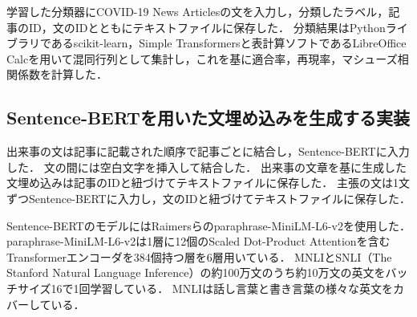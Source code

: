 \documentclass[12pt,a4j,dvipdfmx]{jreport}
\begin{document}

学習した分類器にCOVID-19 News Articlesの文を入力し，分類したラベル，記事のID，文のIDとともにテキストファイルに保存した．
分類結果はPythonライブラリであるscikit-learn，Simple Transformersと表計算ソフトであるLibreOffice Calcを用いて混同行列として集計し，これを基に適合率，再現率，マシューズ相関係数を計算した．

\subsection{Sentence-BERTを用いた文埋め込みを生成する実装}
出来事の文は記事に記載された順序で記事ごとに結合し，Sentence-BERTに入力した．
文の間には空白文字を挿入して結合した．
出来事の文章を基に生成した文埋め込みは記事のIDと紐づけてテキストファイルに保存した．
主張の文は1文ずつSentence-BERTに入力し，文のIDと紐づけてテキストファイルに保存した．


Sentence-BERTのモデルにはRaimersらのparaphrase-MiniLM-L6-v2を使用した\cite{reimers_sentence-bert_2019}．
paraphrase-MiniLM-L6-v2は1層に12個のScaled Dot-Product Attentionを含むTransformerエンコーダを384個持つ層を6層用いている．
MNLIとSNLI（The Stanford Natural Language Inference）の約100万文のうち約10万文の英文をバッチサイズ16で1回学習している．
MNLIは話し言葉と書き言葉の様々な英文をカバーしている．


\end{document}
